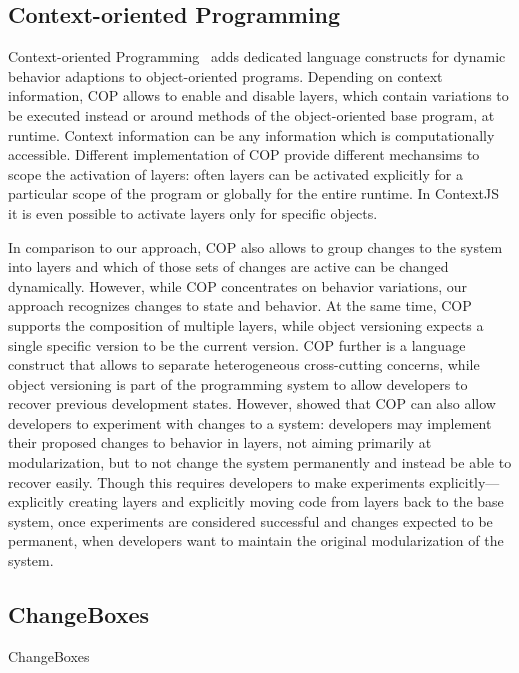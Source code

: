 \subsection{Context-oriented Programming}

Context-oriented Programming~\cite{Hirschfeld2008COP} adds dedicated language constructs for dynamic behavior adaptions to object-oriented programs.
Depending on context information, COP allows to enable and disable layers, which contain variations to be executed instead or around methods of the object-oriented base program, at runtime.
Context information can be any information which is computationally accessible.
Different implementation of COP provide different mechansims to scope the activation of layers: often layers can be activated explicitly for a particular scope of the program or globally for the entire runtime.
In ContextJS~\cite{Lincke2011OIC} it is even possible to activate layers only for specific objects.

In comparison to our approach, COP also allows to group changes to the system into layers and which of those sets of changes are active can be changed dynamically.
However, while COP concentrates on behavior variations, our approach recognizes changes to state and behavior.
At the same time, COP supports the composition of multiple layers, while object versioning expects a single specific version to be the current version.
COP further is a language construct that allows to separate heterogeneous cross-cutting concerns, while object versioning is part of the programming system to allow developers to recover previous development states.
However, \cite{Lincke2012SCS} showed that COP can also allow developers to experiment with changes to a system: developers may implement their proposed changes to behavior in layers, not aiming primarily at modularization, but to not change the system permanently and instead be able to recover easily.
Though this requires developers to make experiments explicitly---explicitly creating layers and explicitly moving code from layers back to the base system, once experiments are considered successful and changes expected to be permanent, when developers want to maintain the original modularization of the system.


\subsection{ChangeBoxes}
ChangeBoxes~\cite{Denker2007EEC}


